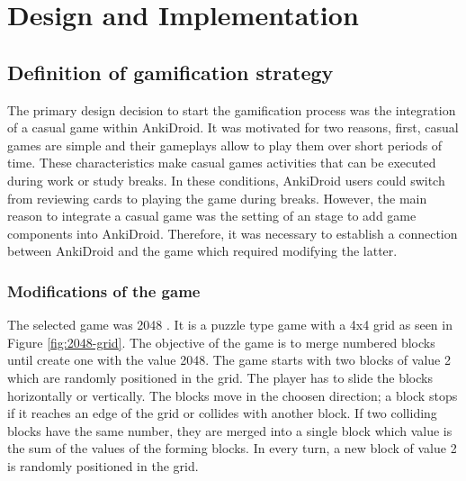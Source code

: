 
\chapter{Design and Implementation} %

\label{desi} %


\section{Definition of gamification strategy}

The primary design decision to start the gamification process was the integration of a casual game within AnkiDroid. It was motivated for two reasons, first, casual games are simple and their gameplays allow to play them over short periods of time. These characteristics make casual games activities that can be executed during work or study breaks. In these conditions, AnkiDroid users could switch from reviewing cards to playing the game during breaks. However, the main reason to integrate a casual game was the setting of an stage to add game components into AnkiDroid. Therefore, it was necessary to establish a connection between AnkiDroid and the game which required modifying the latter.

\subsection{Modifications of the game}
The selected game was 2048 \citep{uberspot2017game}. It is a puzzle type game with a 4x4 grid as seen in Figure \ref{fig:2048-grid}. The objective of the game is to merge numbered blocks until create one with the value 2048. The game starts with two blocks of value 2 which are randomly positioned in the grid. The player has to slide the blocks horizontally or vertically. The blocks move in the choosen direction; a block stops if it reaches an edge of the grid or collides with another block. If two colliding blocks have the same number, they are merged into a single block which value is the sum of the values of the forming blocks. In every turn, a new block of value 2 is randomly positioned in the grid.

